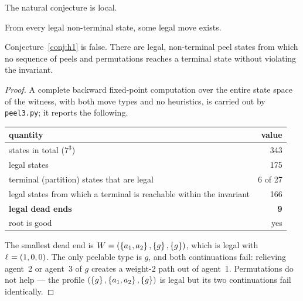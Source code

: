 The natural conjecture is local.

\begin{conjecture}
\label{conj:h1}
From every legal non-terminal state, some legal move exists.
\end{conjecture}

\begin{proposition}
\label{prop:deadends}
Conjecture~\ref{conj:h1} is false. There are legal, non-terminal peel states
from which no sequence of peels and permutations reaches a terminal state
without violating the invariant.
\end{proposition}

\begin{proof}
A complete backward fixed-point computation over the entire state space of the
witness, with both move types and no heuristics, is carried out by
\texttt{peel3.py}; it reports the following.

\begin{center}
\begin{tabular}{@{}lr@{}}
\toprule
quantity & value \\
\midrule
states in total ($7^3$) & 343 \\
legal states & 175 \\
terminal (partition) states that are legal & 6 of 27 \\
legal states from which a terminal is reachable within the invariant & 166 \\
\textbf{legal dead ends} & \textbf{9} \\
root is good & yes \\
\bottomrule
\end{tabular}
\end{center}

The smallest dead end is $W = (\left\{a_1,a_2\right\},\left\{g\right\},\left\{g\right\})$, which
is legal with $\ell_{} = (1,0,0)$. The only peelable type is $g$, and both
continuations fail: relieving agent~2 or agent~3 of $g$ creates a weight-$2$
path out of agent~1. Permutations do not help --- the profile
$(\left\{g\right\},\left\{a_1,a_2\right\},\left\{g\right\})$ is legal but its two continuations fail
identically.
\end{proof}

